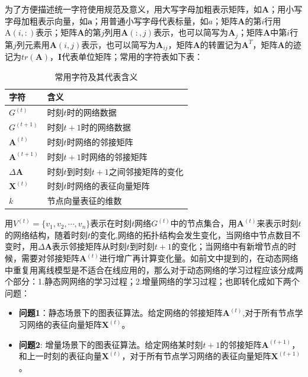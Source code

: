 为了方便描述统一字符使用规范及意义，用大写字母加粗表示矩阵，如$\textbf{A}$；用小写字母加粗表示向量，如$\textbf{a}$；用普通小写字母代表标量，如$a$；矩阵$\textbf{A}$的第$i$行用$\text{A}(i,:)$表示；矩阵$\textbf{A}$的第$j$列用$\textbf{A}(:,j)$表示，也可以简写为$\textbf{A}_j$；矩阵$\textbf{A}$中第$i$行第$j$列元素用$\textbf{A}(i,j)$表示，也可以简写为$\textbf{A}_{ij}$，矩阵$\textbf{A}$的转置记为$\textbf{A}^T$，矩阵$\textbf{A}$的迹记为$tr(\textbf{A})$，$\textbf{I}$代表单位矩阵；常用的字符表如下表：
\begin{table}
	\centering
	\caption{常用字符及其代表含义}
	\begin{tabular}{|C{1.8in}|C{3.3in}|}
		\hline
		\textbf{字符} & \textbf{含义} \\ \hline\hline
		$G^{(t)}$ & 时刻$t$时的网络数据 \\ \hline
		$G^{(t+1)}$& 时刻$t+1$时的网络数据  \\ \hline
		$\textbf{A}^{(t)}$ & 时刻$t$时网络的邻接矩阵 \\ \hline
		$\textbf{A}^{(t+1)}$ & 时刻$t+1$时网络的邻接矩阵 \\ \hline
		$\Delta\textbf{A}$ & 时刻$t$到时刻$t+1$之间邻接矩阵的变化 \\ \hline
		$\textbf{X}^{(t)}$ & 时刻$t$时网络的表征向量矩阵 \\ \hline
		$k$ & 节点向量表征的维数  \\ \hline
	\end{tabular}
\end{table}

用$V^{(t)} = \{v_1, v_2,\cdots,v_n\}$表示在时刻$t$网络$G^{(t)}$中的节点集合，用$\textbf{A}^{(t)}$来表示时刻$t$的网络结构，随着时刻$t$的变化,网络的拓扑结构会发生变化，当网络中节点数目不变时，用$\Delta\textbf{A}$表示邻接矩阵从时刻$t$到时刻$t+1$的变化；当网络中有新增节点的时候，需要对邻接矩阵$\textbf{A}^{(t)}$进行增广再计算变化量。如前文中提到的，在动态网络中重复用离线模型是不适合在线应用的，那么对于动态网络的学习过程应该分成两个部分：1.静态网网络的学习过程；2.增量网络的学习过程；也即转化成如下两个问题：
\begin{itemize}
	\item \textbf{问题1}：静态场景下的图表征算法。给定网络的邻接矩阵$\textbf{A}^{(t)}$,对于所有节点学习网络的表征向量矩阵$\textbf{X}^{(t)}$。
	\item \textbf{问题2}: 增量场景下的图表征算法。给定网络某时刻$t+1$的邻接矩阵$\textbf{A}^{(t+1)}$，
		和上一时刻的表征向量$\textbf{X}^{(t)}$，对于所有节点学习网络的表征向量矩阵$\textbf{X}^{(t+1)}$。
\end{itemize}

